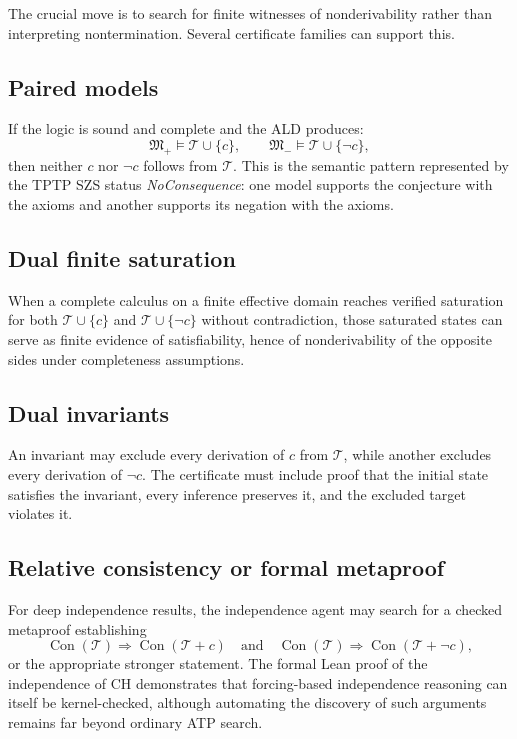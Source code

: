 \documentclass[11pt]{article}
\theoremstyle{definition}
\theoremstyle{remark}
\newcommand{\T}{\mathcal T}
\newcommand{\Con}{\operatorname{Con}}
\begin{document}
The crucial move is to search for finite witnesses of nonderivability rather than interpreting nontermination. Several certificate families can support this.

\subsection{Paired models}
If the logic is sound and complete and the ALD produces:
\[
\mathfrak M_{+}\models \T\cup\{c\},
\qquad
\mathfrak M_{-}\models \T\cup\{\neg c\},
\]
then neither $c$ nor $\neg c$ follows from $\T$. This is the semantic pattern represented by the TPTP SZS status \emph{NoConsequence}: one model supports the conjecture with the axioms and another supports its negation with the axioms.

\subsection{Dual finite saturation}
When a complete calculus on a finite effective domain reaches verified saturation for both $\T\cup\{c\}$ and $\T\cup\{\neg c\}$ without contradiction, those saturated states can serve as finite evidence of satisfiability, hence of nonderivability of the opposite sides under completeness assumptions.

\subsection{Dual invariants}
An invariant may exclude every derivation of $c$ from $\T$, while another excludes every derivation of $\neg c$. The certificate must include proof that the initial state satisfies the invariant, every inference preserves it, and the excluded target violates it.

\subsection{Relative consistency or formal metaproof}
For deep independence results, the independence agent may search for a checked metaproof establishing
\[
\Con(\T)\Rightarrow\Con(\T+c)
\quad\text{and}\quad
\Con(\T)\Rightarrow\Con(\T+\neg c),
\]
or the appropriate stronger statement. The formal Lean proof of the independence of CH demonstrates that forcing-based independence reasoning can itself be kernel-checked, although automating the discovery of such arguments remains far beyond ordinary ATP search.
\end{document}
